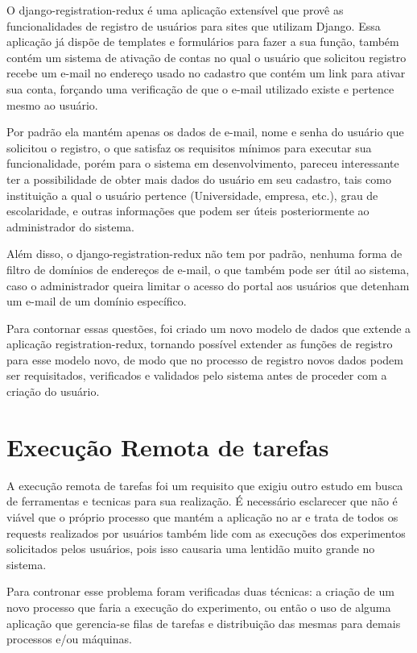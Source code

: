 \documentclass[tg]{mdtufsm}
\begin{document}
O django-registration-redux é uma aplicação extensível que provê as funcionalidades de registro de usuários para sites que utilizam Django. Essa aplicação já dispõe de templates e formulários para fazer a sua função, também contém um sistema de ativação de contas no qual o usuário que solicitou registro recebe um e-mail no endereço usado no cadastro que contém um link para ativar sua conta, forçando uma verificação de que o e-mail utilizado existe e pertence mesmo ao usuário.

 Por padrão ela mantém apenas os dados de e-mail, nome e senha do usuário que solicitou o registro, o que satisfaz os requisitos mínimos para executar sua funcionalidade, porém para o sistema em desenvolvimento, pareceu interessante ter a possibilidade de obter mais dados do usuário em seu cadastro, tais como instituição a qual o usuário pertence (Universidade, empresa, etc.), grau de escolaridade, e outras informações que podem ser úteis posteriormente ao administrador do sistema.

Além disso, o django-registration-redux não tem por padrão, nenhuma forma de filtro de domínios de endereços de e-mail, o que também pode ser útil ao sistema, caso o administrador queira limitar o acesso do portal aos usuários que detenham um e-mail de um domínio específico.

Para contornar essas questões, foi criado um novo modelo de dados que extende a aplicação registration-redux, tornando possível extender as funções de registro para esse modelo novo, de modo que no processo de registro novos dados podem ser requisitados, verificados e validados pelo sistema antes de proceder com a criação do usuário.




\section{Execução Remota de tarefas}
A execução remota de tarefas foi um requisito que exigiu outro estudo em busca de ferramentas e tecnicas para sua realização. É necessário esclarecer que não é viável que o próprio processo que mantém a aplicação no ar e trata de todos os requests realizados por usuários também lide com as execuções dos experimentos solicitados pelos usuários, pois isso causaria uma lentidão muito grande no sistema.

Para contronar esse problema foram verificadas duas técnicas: a criação de um novo processo que faria a execução do experimento, ou então o uso de alguma aplicação que gerencia-se filas de tarefas e distribuição das mesmas para demais processos e/ou máquinas.
\end{document}
